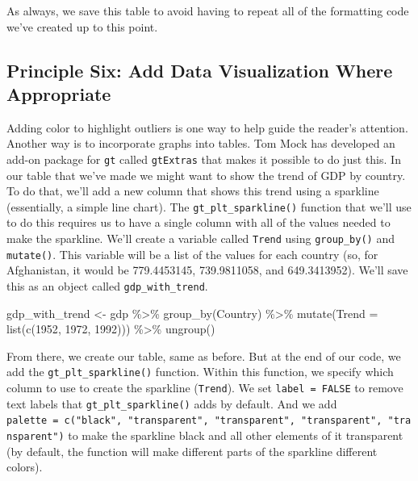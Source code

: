 \documentclass[
]{book}
\newenvironment{Shaded}{\begin{snugshade}}{\end{snugshade}}
\newcommand{\AttributeTok}[1]{\textcolor[rgb]{0.77,0.63,0.00}{#1}}
\newcommand{\FunctionTok}[1]{\textcolor[rgb]{0.00,0.00,0.00}{#1}}
\newcommand{\NormalTok}[1]{#1}
\newcommand{\OtherTok}[1]{\textcolor[rgb]{0.56,0.35,0.01}{#1}}
\newcommand{\SpecialCharTok}[1]{\textcolor[rgb]{0.00,0.00,0.00}{#1}}
\newcommand{\StringTok}[1]{\textcolor[rgb]{0.31,0.60,0.02}{#1}}
\begin{document}
As always, we save this table to avoid having to repeat all of the formatting code we've created up to this point.

\hypertarget{principle-six-add-data-visualization-where-appropriate}{%
\subsection*{Principle Six: Add Data Visualization Where Appropriate}\label{principle-six-add-data-visualization-where-appropriate}}

Adding color to highlight outliers is one way to help guide the reader's attention. Another way is to incorporate graphs into tables. Tom Mock has developed an add-on package for \texttt{gt} called \texttt{gtExtras} that makes it possible to do just this. In our table that we've made we might want to show the trend of GDP by country. To do that, we'll add a new column that shows this trend using a sparkline (essentially, a simple line chart). The \texttt{gt\_plt\_sparkline()} function that we'll use to do this requires us to have a single column with all of the values needed to make the sparkline. We'll create a variable called \texttt{Trend} using \texttt{group\_by()} and \texttt{mutate()}. This variable will be a list of the values for each country (so, for Afghanistan, it would be 779.4453145, 739.9811058, and 649.3413952). We'll save this as an object called \texttt{gdp\_with\_trend}.

\begin{Shaded}
\begin{Highlighting}[]
\NormalTok{gdp\_with\_trend }\OtherTok{\textless{}{-}}\NormalTok{ gdp }\SpecialCharTok{\%\textgreater{}\%} 
  \FunctionTok{group\_by}\NormalTok{(Country) }\SpecialCharTok{\%\textgreater{}\%} 
  \FunctionTok{mutate}\NormalTok{(}\AttributeTok{Trend =} \FunctionTok{list}\NormalTok{(}\FunctionTok{c}\NormalTok{(}\StringTok{\textasciigrave{}}\AttributeTok{1952}\StringTok{\textasciigrave{}}\NormalTok{, }\StringTok{\textasciigrave{}}\AttributeTok{1972}\StringTok{\textasciigrave{}}\NormalTok{, }\StringTok{\textasciigrave{}}\AttributeTok{1992}\StringTok{\textasciigrave{}}\NormalTok{))) }\SpecialCharTok{\%\textgreater{}\%} 
  \FunctionTok{ungroup}\NormalTok{()}
\end{Highlighting}
\end{Shaded}

From there, we create our table, same as before. But at the end of our code, we add the \texttt{gt\_plt\_sparkline()} function. Within this function, we specify which column to use to create the sparkline (\texttt{Trend}). We set \texttt{label\ =\ FALSE} to remove text labels that \texttt{gt\_plt\_sparkline()} adds by default. And we add \texttt{palette\ =\ c("black",\ "transparent",\ "transparent",\ "transparent",\ "transparent")} to make the sparkline black and all other elements of it transparent (by default, the function will make different parts of the sparkline different colors).
\end{document}
